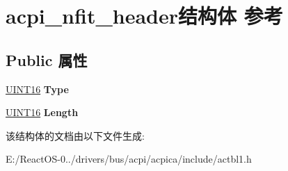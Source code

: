 \hypertarget{structacpi__nfit__header}{}\section{acpi\+\_\+nfit\+\_\+header结构体 参考}
\label{structacpi__nfit__header}
\subsection*{Public 属性}
\begin{DoxyCompactItemize}
\item 
\mbox{\label{structacpi__nfit__header_a4d7fb65f93a5de6b6ac66488e7c51e39}} 
\hyperlink{_processor_bind_8h_a09f1a1fb2293e33483cc8d44aefb1eb1}{U\+I\+N\+T16} {\bfseries Type}
\item 
\mbox{\label{structacpi__nfit__header_a802c4be62dd9536524e0e80c8e4d083e}} 
\hyperlink{_processor_bind_8h_a09f1a1fb2293e33483cc8d44aefb1eb1}{U\+I\+N\+T16} {\bfseries Length}
\end{DoxyCompactItemize}


该结构体的文档由以下文件生成\+:\begin{DoxyCompactItemize}
\item 
E\+:/\+React\+O\+S-\/0../drivers/bus/acpi/acpica/include/actbl1.\+h\end{DoxyCompactItemize}
